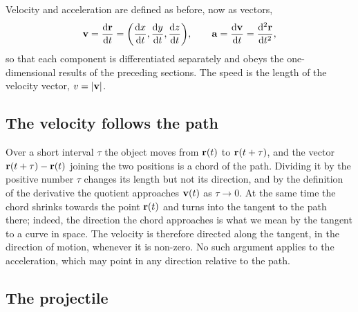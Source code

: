 
Velocity and acceleration are defined as before, now as vectors,
\begin{equation*}
   \bm{\mathrm{v}} = \frac{\mathrm{d}\bm{\mathrm{r}}}{\mathrm{d} t}
   = \biggl(\frac{\mathrm{d} x}{\mathrm{d} t}, \frac{\mathrm{d} y}{\mathrm{d} t},
   \frac{\mathrm{d} z}{\mathrm{d} t}\biggr), \qquad
   \bm{\mathrm{a}} = \frac{\mathrm{d}\bm{\mathrm{v}}}{\mathrm{d} t} = \frac{\mathrm{d}^2\bm{\mathrm{r}}}{\mathrm{d} t^2},
\end{equation*}
so that each component is differentiated separately and obeys the
one-dimensional results of the preceding sections. The speed is the length
of the velocity vector, $v = \lvert{}\rvert$.

\subsection*{The velocity follows the path}

Over a short interval $\tau$ the object moves from $(t)$ to
$(t+\tau)$, and the vector $(t+\tau) - (t)$ joining the
two positions is a chord of the path. Dividing it by the positive number
$\tau$ changes its length but not its direction, and by the definition of
the derivative the quotient approaches $(t)$ as $\tau {}$. At the
same time the chord shrinks towards the point $(t)$ and turns into
the tangent to the path there; indeed, the direction the chord approaches
is what we mean by the tangent to a curve in space. The velocity is
therefore directed along
the tangent, in the direction of motion, whenever it is non-zero. No such
argument applies to the acceleration, which may point in any direction
relative to the path.

\subsection*{The projectile}

